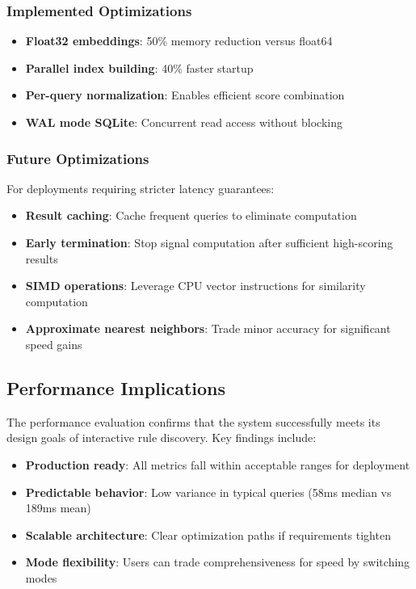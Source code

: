 \subsubsection{Implemented Optimizations}

\begin{itemize}[leftmargin=*,itemsep=2pt,topsep=2pt]
 \item \textbf{Float32 embeddings}: 50\% memory reduction versus float64
 \item \textbf{Parallel index building}: 40\% faster startup
 \item \textbf{Per-query normalization}: Enables efficient score combination
 \item \textbf{WAL mode SQLite}: Concurrent read access without blocking
\end{itemize}

\subsubsection{Future Optimizations}

For deployments requiring stricter latency guarantees:

\begin{itemize}[leftmargin=*,itemsep=2pt,topsep=2pt]
 \item \textbf{Result caching}: Cache frequent queries to eliminate computation
 \item \textbf{Early termination}: Stop signal computation after sufficient high-scoring results
 \item \textbf{SIMD operations}: Leverage CPU vector instructions for similarity computation
 \item \textbf{Approximate nearest neighbors}: Trade minor accuracy for significant speed gains
\end{itemize}

\subsection{Performance Implications}

The performance evaluation confirms that the system successfully meets its design goals of interactive rule discovery. Key findings include:

\begin{itemize}[leftmargin=*,itemsep=2pt,topsep=2pt]
 \item \textbf{Production ready}: All metrics fall within acceptable ranges for deployment
 \item \textbf{Predictable behavior}: Low variance in typical queries (58ms median vs 189ms mean)
 \item \textbf{Scalable architecture}: Clear optimization paths if requirements tighten
 \item \textbf{Mode flexibility}: Users can trade comprehensiveness for speed by switching modes
\end{itemize}

